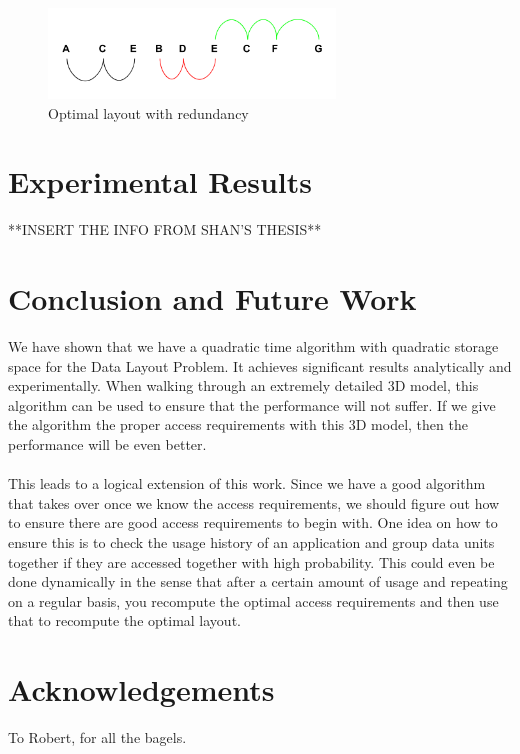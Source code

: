 \documentclass[conference]{acmsiggraph}
\begin{document}
\begin{figure}[ht]
\centering
\includegraphics[width=3in]{examplePic_withRedundancy.png}
\caption{Optimal layout with redundancy}
\end{figure} 

\section{Experimental Results}

**INSERT THE INFO FROM SHAN'S THESIS**


\section{Conclusion and Future Work}

We have shown that we have a quadratic time algorithm with quadratic storage space for the Data Layout Problem. It achieves significant results analytically and experimentally. When walking through an extremely detailed 3D model, this algorithm can be used to ensure that the performance will not suffer. If we give the algorithm the proper access requirements with this 3D model, then the performance will be even better.\\
\\
This leads to a logical extension of this work. Since we have a good algorithm that takes over once we know the access requirements, we should figure out how to ensure there are good access requirements to begin with. One idea on how to ensure this is to check the usage history of an application and group data units together if they are accessed together with high probability. This could even be done dynamically in the sense that after a certain amount of usage and repeating on a regular basis, you recompute the optimal access requirements and then use that to recompute the optimal layout. 

\section{Acknowledgements}

To Robert, for all the bagels.



\end{document}
